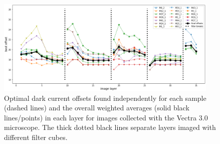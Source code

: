 \documentclass[letterpaper,11pt]{article}
\begin{document}
\begin{figure}[!ht]
\centering
\includegraphics[width=0.95\textwidth]{images/results/dark_current_offsets_vectra}
\caption{\footnotesize Optimal dark current offsets found independently for each sample (dashed lines) and the overall weighted averages (solid black lines/points) in each layer for images collected with the Vectra 3.0 microscope. The thick dotted black lines separate layers imaged with different filter cubes.}
\label{fig:dark_current_offsets_vectra}
\end{figure}
\end{document}

